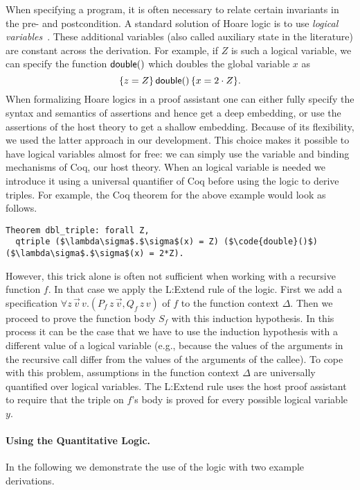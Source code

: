 \documentclass[nocopyrightspace,preprint]{sigplanconf}
\begin{document}
When specifying a program, it is often necessary to relate certain
invariants in the pre- and postcondition.  A standard solution of Hoare
logic is to use \emph{logical variables}~\cite{Kleymann99}.  These
additional variables (also called auxiliary state in the literature)
are constant across the derivation.  For example, if $Z$ is such
a logical variable, we can specify the function $\mathsf{double}()$
which doubles the global variable $x$ as
$$
  \{z = Z\}\, \mathsf{double}()\, \{x = 2 \cdot Z\}.
$$
%
When formalizing Hoare logics in a proof assistant one can either
fully specify the syntax and semantics of assertions and hence get a
deep embedding, or use the assertions of the host theory to get a
shallow embedding.  Because of its flexibility, we used the latter
approach in our development.  This choice makes it possible to have
logical variables almost for free: we can simply use the variable and
binding mechanisms of Coq, our host theory.  When an logical variable
is needed we introduce it using a universal quantifier of Coq before
using the logic to derive triples.  For example, the Coq theorem for
the above example would look as follows.
%
\begin{lstlisting}
Theorem dbl_triple: forall Z,
  qtriple ($\lambda\sigma$.$\sigma$(x) = Z) ($\code{double}()$) ($\lambda\sigma$.$\sigma$(x) = 2*Z).
\end{lstlisting}
%
However, this trick alone is often not sufficient when working with a
recursive function $f$.  In that case we apply the {\sc L:Extend} rule
of the logic.  First we add a specification $\forall z\,\vec
v\,v.(P_f\,z\,\vec v, Q_f\,z\,v)$ of $f$ to the function context
$\Delta$.  Then we proceed to prove the function body $S_f$ with this
induction hypothesis.  In this process it can be the case that we have
to use the induction hypothesis with a different value of a logical
variable (e.g., because the values of the arguments in the recursive
call differ from the values of the arguments of the callee).  To cope
with this problem, assumptions in the function context $\Delta$ are
universally quantified over logical variables.  The {\sc L:Extend}
rule uses the host proof assistant to require that the triple on $f$'s
body is proved for every possible logical variable $y$.


\paragraph{Using the Quantitative Logic.}

In the following we demonstrate the use of the logic with two example
derivations.
\end{document}

